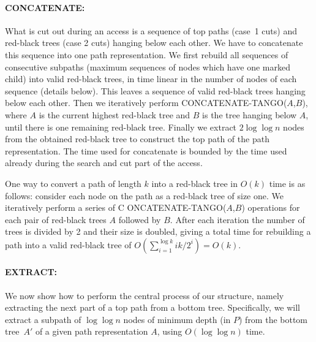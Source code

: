 \documentclass[letterpaper,11pt]{article}
\newcommand{\toppath}{top path}
\newcommand{\bottomtree}{bottom tree}
\newcounter{todo}
\newcommand{\todo}[1]{}
\begin{document}
\paragraph{CONCATENATE:}


What is cut out during an access is a sequence of \toppath{}s (case~1 cuts)
and red-black trees (case 2 cuts) hanging below each other. We have to
concatenate this sequence into one path representation. We first rebuild
all sequences of consecutive subpaths (maximum sequences of nodes which
have one marked child) into valid red-black trees, in time linear in the
number of nodes of each sequence (details below). This leaves a sequence of
valid red-black trees hanging below each other. Then we iteratively perform
C{\scriptsize ONCATENATE}-T{\scriptsize ANGO}($A$,$B$), where $A$ is the
current highest red-black tree and $B$ is the tree hanging below $A$, until
there is one remaining red-black tree. Finally we extract $2\log \log n$
nodes from the obtained red-black tree to construct the \toppath{} of the path
representation. The time used for concatenate is bounded by the time used
already during the search and cut part of the access.

\todo{(Rolf)Karim: I here removed the note on efficiency by reusing the toppath,
as this may no longer exists, by the change of Case 2, as mentioned in the
last Todo above. Please check. Rolf.\\
(Karim) I think we still have that the sequence of cut out parts is composed first by
$\Theta(\log \log n)$ nodes forming a path. Anyway we will discuss that for the final 
version.}


One way to convert a path of length $k$ into a red-black tree in $O(k)$
time is as follows: consider each node on the path as a red-black tree of
size one. We iteratively perform a series of C{\scriptsize
ONCATENATE}-T{\scriptsize ANGO}($A$,$B$) operations for each pair of
red-black trees $A$ followed by $B$. After each iteration the number of
trees is divided by 2 and their size is doubled, giving a total time for
rebuilding a path into a valid red-black tree of $O(\sum_{i=1}^{\log k}
ik/2^i)=O(k)$.

\paragraph{EXTRACT:}



We now show how to perform the central process of our structure, namely
extracting the next part of a \toppath{} from a
\bottomtree{}. Specifically, we will extract a subpath of $\log \log n$
nodes of minimum depth (in $P$) from the \bottomtree{}~$A'$ of a given path
representation $A$, using $O(\log \log n)$ time.
\end{document}
